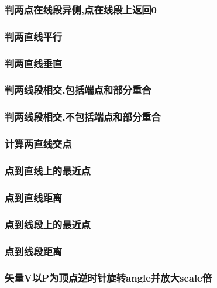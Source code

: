 \subsubsection{判两点在线段异侧,点在线段上返回0}

\subsubsection{判两直线平行}

\subsubsection{判两直线垂直}

\subsubsection{判两线段相交,包括端点和部分重合}

\subsubsection{判两线段相交,不包括端点和部分重合}

\subsubsection{计算两直线交点}

\subsubsection{点到直线上的最近点}

\subsubsection{点到直线距离}

\subsubsection{点到线段上的最近点}

\subsubsection{点到线段距离}

\subsubsection{矢量V以P为顶点逆时针旋转angle并放大scale倍}


